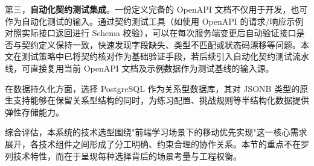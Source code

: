第三，\textbf{自动化契约测试集成}。一份定义完备的 OpenAPI 文档不仅用于开发，也可作为自动化测试的输入。通过契约测试工具（如使用 OpenAPI 的请求/响应示例对照实际接口返回进行 Schema 校验），可以在每次服务端变更后自动验证接口是否与契约定义保持一致，快速发现字段缺失、类型不匹配或状态码漂移等问题。本文在测试策略中已将契约核对作为基础验证手段，若后续引入自动化契约测试流水线，可直接复用当前 OpenAPI 文档及示例数据作为测试基线的输入源。

在数据持久化方面，选择 PostgreSQL 作为关系型数据库，其对 JSONB 类型的原生支持能够在保留关系型结构的同时，为练习配置、挑战规则等半结构化数据提供弹性存储能力。

综合评估，本系统的技术选型围绕"前端学习场景下的移动优先实现"这一核心需求展开，各技术组件之间形成了分工明确、约束合理的协作关系。本节的重点不在罗列技术特性，而在于呈现每种选择背后的场景考量与工程权衡。
